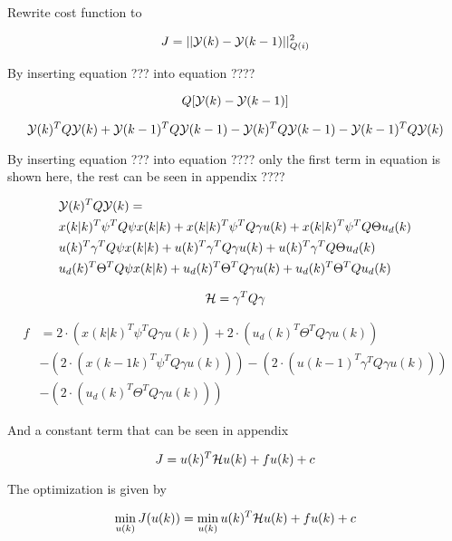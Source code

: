 Rewrite cost function to

\begin{equation}
	J = ||\CMcal{Y}(k)-\CMcal{Y}(k-1)||_{Q(i)}^2
\end{equation}

By inserting equation ??? into equation ????

\begin{equation}
	[\CMcal{Y}(k)^T - \CMcal{Y}(k-1)^T]Q[\CMcal{Y}(k) - \CMcal{Y}(k-1)]
\end{equation}



\begin{equation}
	\CMcal{Y}(k)^TQ\CMcal{Y}(k)+ \CMcal{Y}(k-1)^TQ\CMcal{Y}(k-1)-\CMcal{Y}(k)^TQ\CMcal{Y}(k-1)-\CMcal{Y}(k-1)^TQ\CMcal{Y}(k)
\end{equation}


By inserting equation ??? into equation ???? only the first term in equation is shown here, the rest can be seen in appendix ????

\begin{equation}
	\begin{aligned}
	&\CMcal{Y}(k)^TQ\CMcal{Y}(k) = \\
	& x(k|k)^T\psi ^T Q \psi x(k|k) + x(k|k)^T \psi ^T Q \gamma u(k) + x(k|k)^T \psi ^T Q \Theta u_d(k) \\
	& u(k)^T \gamma ^T Q \psi x(k|k) +  u(k)^T \gamma ^T Q \gamma u(k) + u(k)^T \gamma ^T Q\Theta  u_d(k)\\ 
	&  u_d(k)^T \Theta ^T Q  \psi x(k|k)+u_d(k)^T \Theta ^T Q \gamma u(k) +u_d(k)^T \Theta ^T Q u_d(k)
	\end{aligned}
\end{equation}



\begin{equation}
	\CMcal{H} = \gamma^T Q\gamma 
\end{equation}

\begin{equation}
	\begin{aligned}
	f &= 2\cdot(x(k|k)^T\psi^T Q \gamma u(k))+2\cdot(u_d(k)^T\Theta^TQ\gamma u(k)) \\
	  &-(2\cdot(x(k-1k)^T\psi^T Q \gamma u(k)))-(2\cdot(u(k-1)^T\gamma^TQ\gamma u(k))) \\
	  &-(2\cdot(u_d(k)^T\Theta^TQ\gamma u(k)))
	\end{aligned}
\end{equation}

And a constant term that can be seen in appendix

\begin{equation}
	J =  u(k)^T\CMcal{H} u(k)+ f u(k)+ c
\end{equation}

The optimization is given by

\begin{equation}
	\min_{u(k)} J(u(k)) =\min_{u(k)} u(k)^T\CMcal{H}u(k)+fu(k)+c
\end{equation}
